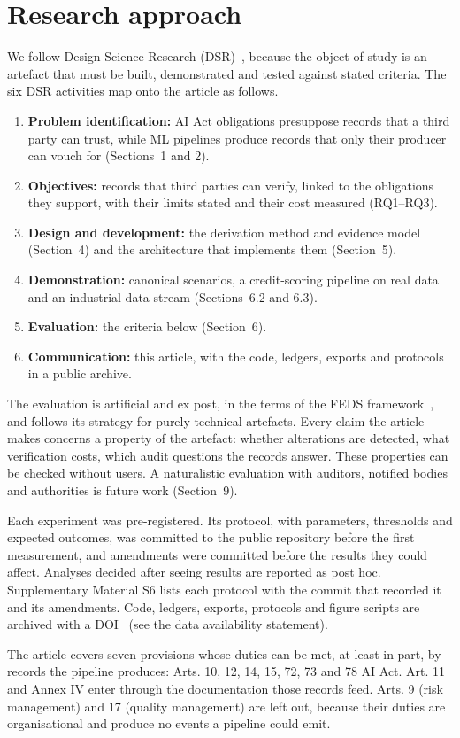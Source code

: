 \section{Research approach}
\label{sec:approach}

We follow Design Science Research (DSR)~\cite{peffers2007}, because the object of study is an artefact that must be built, demonstrated and tested against stated criteria. The six DSR activities map onto the article as follows.

\begin{enumerate}
\def\labelenumi{\arabic{enumi}.}
\tightlist
\item
  \textbf{Problem identification:} AI Act obligations presuppose records that a third party can trust, while ML pipelines produce records that only their producer can vouch for (Sections~1 and 2).
\item
  \textbf{Objectives:} records that third parties can verify, linked to the obligations they support, with their limits stated and their cost measured (RQ1--RQ3).
\item
  \textbf{Design and development:} the derivation method and evidence model (Section~4) and the architecture that implements them (Section~5).
\item
  \textbf{Demonstration:} canonical scenarios, a credit-scoring pipeline on real data and an industrial data stream (Sections~6.2 and 6.3).
\item
  \textbf{Evaluation:} the criteria below (Section~6).
\item
  \textbf{Communication:} this article, with the code, ledgers, exports and protocols in a public archive.
\end{enumerate}

The evaluation is artificial and ex post, in the terms of the FEDS framework~\cite{venable2016}, and follows its strategy for purely technical artefacts. Every claim the article makes concerns a property of the artefact: whether alterations are detected, what verification costs, which audit questions the records answer. These properties can be checked without users. A naturalistic evaluation with auditors, notified bodies and authorities is future work (Section~9).



Each experiment was pre-registered. Its protocol, with parameters, thresholds and expected outcomes, was committed to the public repository before the first measurement, and amendments were committed before the results they could affect. Analyses decided after seeing results are reported as post hoc. Supplementary Material S6 lists each protocol with the commit that recorded it and its amendments. Code, ledgers, exports, protocols and figure scripts are archived with a DOI~\cite{artefacts} (see the data availability statement).

The article covers seven provisions whose duties can be met, at least in part, by records the pipeline produces: Arts. 10, 12, 14, 15, 72, 73 and 78 AI Act. Art. 11 and Annex IV enter through the documentation those records feed. Arts. 9 (risk management) and 17 (quality management) are left out, because their duties are organisational and produce no events a pipeline could emit.
